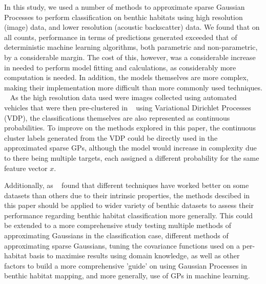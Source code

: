 \documentclass[10pt,sts]{article}
\begin{document}
\begin{multicols}{2}
In this study, we used a number of methods to approximate sparse Gaussian Processes to perform classification on benthic habitats using high resolution (image) data, and lower resolution (acoustic backscatter) data. We found that on all counts, performance in terms of predictions generated exceeded that of deterministic machine learning algorithms, both parametric and non-parametric, by a considerable margin. The cost of this, however, was a considerable increase in needed to perform model fitting and calculations, as considerably more computation is needed. In addition, the models themselves are more complex, making their implementation more difficult than more commonly used techniques.
~\cite{ahsan11}
As the high resolution data used were images collected using automated vehicles that were then pre-clustered in ~\citet{steinberg11} using Variational Dirichlet Processes (VDP), the classifications themselves are also represented as continuous probabilities. To improve on the methods explored in this paper, the continuous cluster labels generated from the VDP could be directly used in the approximated sparse GPs, although the model would increase in complexity due to there being multiple targets, each assigned a different probability for the same feature vector $x$. 

Additionally, as ~\citet{ahsan14} found that different techniques have worked better on some datasets than others due to their intrinsic properties, the methods descibed in this paper should be applied to wider variety of benthic datasets to assess their performance regarding benthic habitat classification more generally. This could be extended to a more comprehensive study testing multiple methods of approximating Gaussians in the classification case, different methods of approximating sparse Gaussians, tuning the covariance functions used on a per-habitat basis to maximise results using domain knowledge, as well as other factors to build a more comprehensive 'guide' on using Gaussian Processes in benthic habitat mapping, and more generally, use of GPs in machine learning.






\end{multicols}
\end{document}
